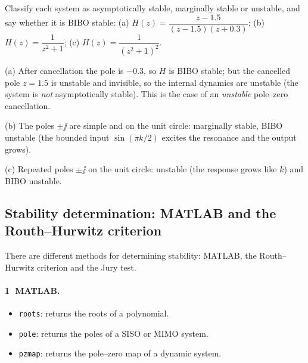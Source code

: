 \begin{problem}
Classify each system as asymptotically stable, marginally stable or unstable, and say whether it is BIBO stable:
(a) $H(z)=\dfrac{z-1.5}{(z-1.5)(z+0.3)}$; (b) $H(z)=\dfrac{1}{z^{2}+1}$; (c) $H(z)=\dfrac{1}{(z^{2}+1)^{2}}$.
\end{problem}
\begin{solution}
(a) After cancellation the pole is $-0.3$, so $H$ is BIBO stable; but the cancelled pole $z=1.5$ is unstable
and invisible, so the internal dynamics are unstable (the system is \emph{not} asymptotically stable). This
is the case of an \emph{unstable} pole--zero cancellation.\par
(b) The poles $\pm\jj$ are simple and on the unit circle: marginally stable, BIBO unstable (the bounded input
$\sin(\pi k/2)$ excites the resonance and the output grows).\par
(c) Repeated poles $\pm\jj$ on the unit circle: unstable (the response grows like $k$) and BIBO unstable.
\end{solution}

\subsection{Stability determination: MATLAB and the Routh--Hurwitz criterion}
There are different methods for determining stability: MATLAB, the Routh--Hurwitz criterion and the Jury test.

\paragraph{\textcircled{1} MATLAB.}
\begin{itemize}
  \item \texttt{roots}: returns the roots of a polynomial.
  \item \texttt{pole}: returns the poles of a SISO or MIMO system.
  \item \texttt{pzmap}: returns the pole--zero map of a dynamic system.
\end{itemize}

